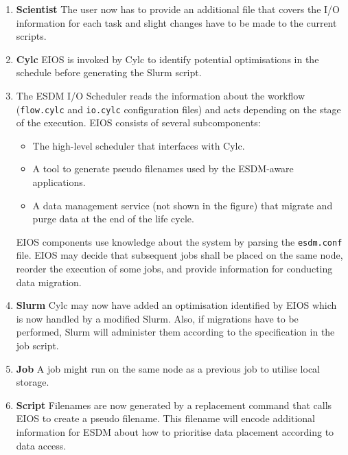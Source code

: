 \documentclass{superfri}
\newcommand{\bnl}[1]{\textcolor{green}{BNL: #1}}
\begin{document}
\begin{enumerate}

  \item \textbf{Scientist} The user now has to provide an additional file that covers the I/O information for each task and slight changes have to be made to the current scripts.

  \item \textbf{Cylc} EIOS is invoked by Cylc to identify potential optimisations in the schedule before generating the Slurm script.

  \item \textbf{\color{red}{EIOS}} The ESDM I/O Scheduler reads the information about the workflow (\texttt{flow.cylc} and \texttt{io.cylc} configuration files) and acts depending on the stage of the execution.
  EIOS consists of several subcomponents:
    \begin{itemize}

      \item The high-level scheduler that interfaces with Cylc.

      \item A tool to generate pseudo filenames used by the ESDM-aware applications.

      \item A data management service (not shown in the figure) that migrate and purge data at the end of the life cycle.
    \end{itemize}
  EIOS components use knowledge about the system by parsing the \texttt{esdm.conf} file.
  EIOS may decide that subsequent jobs shall be placed on the same node, reorder the execution of some jobs, and provide information for conducting data migration.

  \item \textbf{Slurm}
  Cylc may now have added an optimisation identified by EIOS which is now handled by a modified Slurm.
  Also, if migrations have to be performed, Slurm will administer them according to the specification in the job script.

  \item \textbf{Job}
  A job might run on the same node as a previous job to utilise local storage.

  \item \textbf{Script}
  Filenames are now generated by a replacement command that calls EIOS to create a pseudo filename.
  This filename will encode additional information for ESDM about how to prioritise data placement according to data access.


\end{enumerate}
\end{document}
